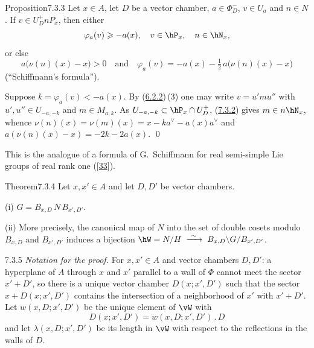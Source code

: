 \documentclass[12pt,a4paper,oneside,english]{smfart}
\makeatletter
\newcommand{\btanchor}[1]{\leavevmode\Hy@raisedlink{\hypertarget{bt:#1}{}}}
\newcommand{\btref}[1]{\hyperlink{bt:#1}{#1}}
\newcommand{\btbib}[1]{\hyperlink{bib:#1}{#1}}
\theoremstyle{definition}
\theoremstyle{bt}
\makeatother
\begin{document}
\begin{stmt}{Proposition}{7.3.3}\btanchor{7.3.3}
Let $x\in A$, let $D$ be a vector chamber, $a\in\Phi_D^{-}$, $v\in U_a$ and $n\in N$.
If $v\in U_D^{+}nP_x$, then either
\[
  \varphi_a(v)\geqslant-a(x),\quad v\in\hP_x,\quad n\in\hN_x,
\]
or else
\[
  a\bigl(\nu(n)(x)-x\bigr)>0
  \quad\text{and}\quad
  \varphi_a(v)=-a(x)-\tfrac12\,a\bigl(\nu(n)(x)-x\bigr)
\]
\textup{(``Schiffmann's formula'')}.
\end{stmt}

\pf Suppose $k=\varphi_a(v)<-a(x)$. By (\btref{6.2.2})\,(3) one may write $v=u'mu''$ with
$u',u''\in U_{-a,-k}$ and $m\in M_{a,k}$. As $U_{-a,-k}\subset\hP_x\cap U_D^{+}$,
(\btref{7.3.2}) gives $m\in n\hN_x$, whence $\nu(n)(x)=\nu(m)(x)=x-ka^{\vee}-a(x)a^{\vee}$
and $a(\nu(n)(x)-x)=-2k-2a(x)$. \qed

\smallskip
This is the analogue of a formula of G.~Schiffmann for real semi-simple Lie groups
of real rank one ([\btbib{33}]).

\begin{stmt}{Theorem}{7.3.4}\btanchor{7.3.4}
Let $x,x'\in A$ and let $D,D'$ be vector chambers.

(i) $G=B_{x,D}\,N\,B_{x',D'}$.

(ii) More precisely, the canonical map of $N$ into the set of double cosets modulo
$B_{x,D}$ and $B_{x',D'}$ induces a bijection
$\hW=N/H\;\xrightarrow{\ \sim\ }\;B_{x,D}\backslash G/B_{x',D'}$.
\end{stmt}

\num{7.3.5}\btanchor{7.3.5} \emph{Notation for the proof.} For $x,x'\in A$ and vector chambers
$D,D'$: a hyperplane of $A$ through $x$ and $x'$ parallel to a wall of $\Phi$ cannot
meet the sector $x'+D'$, so there is a unique vector chamber $D(x;x',D')$ such that
the sector $x+D(x;x',D')$ contains the intersection of a neighborhood of $x'$ with
$x'+D'$. Let $w(x,D;x',D')$ be the unique element of $\vW$ with
\begin{equation}
  D(x;x',D')=w(x,D;x',D')\,.\,D \tag{1}
\end{equation}
and let $\lambda(x,D;x',D')$ be its length in $\vW$ with respect to the reflections
in the walls of $D$.
\end{document}
